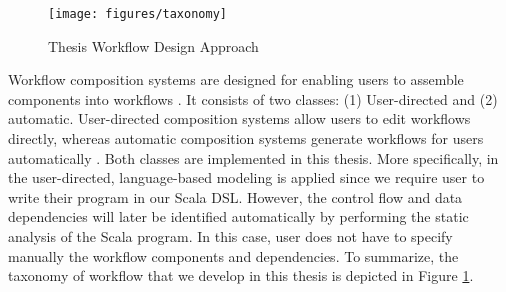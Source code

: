 \begin{figure}[here]
\centering
\texttt{[image: figures/taxonomy]}
\caption{Thesis Workflow Design Approach}
\label{fig:Taxonomy}
\end{figure}

Workflow composition systems are designed for enabling users to assemble components into workflows \cite{yu2005taxonomy}. It consists of two classes: (1) User-directed and (2) automatic.  User-directed composition systems allow users to edit workflows directly, whereas automatic composition systems generate workflows for users automatically \cite{yu2005taxonomy}. Both classes are implemented in this thesis. More specifically, in the user-directed, language-based modeling is applied since we require user to write their program in our Scala DSL. However, the control flow and data dependencies will later be identified automatically by performing the static analysis of the Scala program. In this case, user does not have to specify manually the workflow components and dependencies. To summarize, the taxonomy of workflow that we develop in this thesis is depicted in Figure \ref{fig:Taxonomy}.


